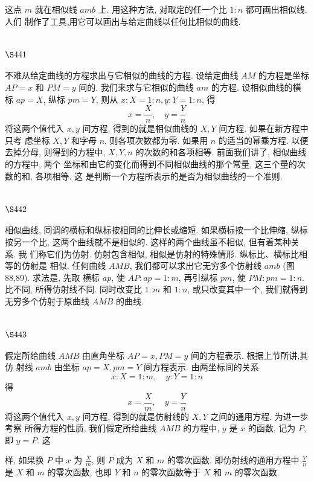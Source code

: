 这点 $m$ 就在相似线 $a m b$ 上. 用这种方法, 对取定的任一个比 $1: n$ 都可画出相似线. 人们 制作了工具,用它可以画出与给定曲线以任何比相似的曲线.

\section{$\S 441$}

不难从给定曲线的方程求出与它相似的曲线的方程. 设给定曲线 $A M$ 的方程是坐标 $A P=x$ 和 $P M=y$ 间的. 我们来求与它相似的曲线 $a m$ 的方程. 设相似曲线的横标 $a p=X$, 纵标 $p m=Y$, 则从 $x: X=1: n, y: Y=1: n$, 得
\[
x=\frac{X}{n}, \quad y=\frac{Y}{n}
\]
将这两个值代入 $x, y$ 间方程, 得到的就是相似曲线的 $X, Y$ 间方程. 如果在新方程中只考 虑坐标 $X, Y$ 和字母 $n$, 则各项次数都为零. 如果用 $n$ 的适当的幂乘方程. 以便去掉分母, 则得到的方程中, $X, Y, n$ 的次数的和各项相等. 前面我们讲了, 相似曲线的方程中, 两个 坐标和由它的变化而得到不同相似曲线的那个常量, 这三个量的次数的和, 各项相等. 这 是判断一个方程所表示的是否为相似曲线的一个准则.

\section{$\S 442$}

相似曲线, 同调的横标和纵标按相同的比伸长或缩短. 如果横标按一个比伸缩, 纵标 按另一个比, 这两个曲线就不是相似的. 这样的两个曲线虽不相似, 但有着某种关系. 我 们称它们为仿射. 仿射包含相似, 相似是仿射的特殊情形. 纵标比、横标比相等的仿射是 相似. 任何曲线 $A M B$, 我们都可以求出它无穷多个仿射线 $a m b$ (图 88,89). 求法是, 先取 横标 $a p$, 使 $A P: a p=1: m$, 再引纵标 $p m$, 使 $P M: p m=1: n$. 比不同, 所得仿射线不同. 同时改变比 $1: m$ 和 $1: n$, 或只改变其中一个, 我们就得到无穷多个仿射于原曲线 $A M B$ 的曲线. 

\section{$\S 443$}

假定所给曲线 $A M B$ 由直角坐标 $A P=x, P M=y$ 间的方程表示. 根据上节所讲,其仿 射线 $a m b$ 由坐标 $a p=X, p m=Y$ 间方程表示. 由两坐标间的关系
\[
x: X=1: m, \quad y: Y=1: n
\]
得
\[
x=\frac{X}{m}, \quad y=\frac{Y}{n}
\]
将这两个值代入 $x, y$ 间方程, 得到的就是仿射线的 $X, Y$ 之间的通用方程. 为进一步考察 所得方程的性质, 我们假定所给曲线 $A M B$ 的方程中, $y$ 是 $x$ 的函数, 记为 $P$, 即 $y=P$. 这

样, 如果换 $P$ 中 $x$ 为 $\frac{X}{m}$, 则 $P$ 成为 $X$ 和 $m$ 的零次函数. 即仿射线的通用方程中 $\frac{Y}{n}$ 是 $X$ 和 $m$ 的零次函数, 也即 $Y$ 和 $n$ 的零次函数等于 $X$ 和 $m$ 的零次函数.

